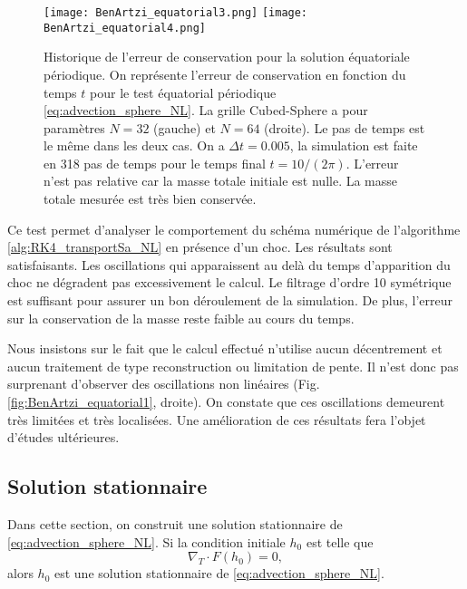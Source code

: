 \begin{figure}[htbp]
\begin{center}
\texttt{[image: BenArtzi\_equatorial3.png]}
\texttt{[image: BenArtzi\_equatorial4.png]}
\end{center}
\caption{Historique de l'erreur de conservation pour la solution équatoriale périodique. On représente l'erreur de conservation en fonction du temps $t$ pour le test équatorial périodique \eqref{eq:advection_sphere_NL}. La grille Cubed-Sphere a pour paramètres $N=32$ (gauche) et $N=64$ (droite). Le pas de temps est le même dans les deux cas. On a $\Delta t = 0.005$, la simulation est faite en 318 pas de temps pour le temps final $t=10/(2\pi)$. L'erreur n'est pas relative car la masse totale initiale est nulle. La masse totale mesurée est très bien conservée.}
\label{fig:BenArtzi_equatorial3}
\end{figure} 

Ce test permet d'analyser le comportement du schéma numérique de l'algorithme \ref{alg:RK4_transportSa_NL} en présence d'un choc. Les résultats sont satisfaisants. Les oscillations qui apparaissent au delà du temps d'apparition du choc ne dégradent pas excessivement le calcul. Le filtrage d'ordre 10 symétrique est suffisant pour assurer un bon déroulement de la simulation. De plus, l'erreur sur la conservation de la masse reste faible au cours du temps.

Nous insistons sur le fait que le calcul effectué n'utilise aucun décentrement et aucun traitement de type reconstruction ou limitation de pente. Il n'est donc pas surprenant d'observer des oscillations non linéaires (Fig. \ref{fig:BenArtzi_equatorial1}, droite). On constate que ces oscillations demeurent très limitées et très localisées. Une amélioration de ces résultats fera l'objet d'études ultérieures.





















\subsection{Solution stationnaire}

Dans cette section, on construit une solution stationnaire de \eqref{eq:advection_sphere_NL}. Si la condition initiale $h_0$ est telle que
\begin{equation}
\nabla_T \cdot F(h_0) = 0,
\end{equation}
alors $h_0$ est une solution stationnaire de \eqref{eq:advection_sphere_NL}.

